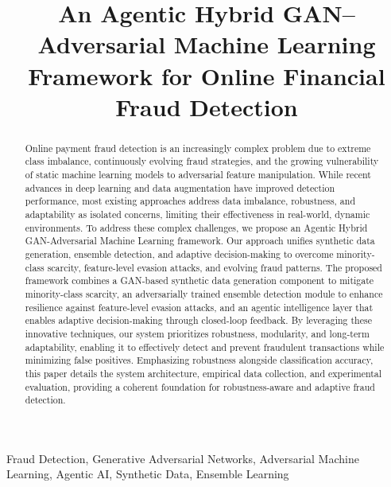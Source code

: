 \documentclass[conference]{IEEEtran}
\begin{document}
\title{An Agentic Hybrid GAN--Adversarial Machine Learning Framework for Online Financial Fraud Detection}

\author{
}

\maketitle

\begin{abstract}
Online payment fraud detection is an increasingly complex problem due to extreme class imbalance, continuously evolving fraud strategies, and the growing vulnerability of static machine learning models to adversarial feature manipulation. While recent advances in deep learning and data augmentation have improved detection performance, most existing approaches address data imbalance, robustness, and adaptability as isolated concerns, limiting their effectiveness in real-world, dynamic environments. To address these complex challenges, we propose an Agentic Hybrid GAN-Adversarial Machine Learning framework. Our approach unifies synthetic data generation, ensemble detection, and adaptive decision-making to overcome minority-class scarcity, feature-level evasion attacks, and evolving fraud patterns. The proposed framework combines a GAN-based synthetic data generation component to mitigate minority-class scarcity, an adversarially trained ensemble detection module to enhance resilience against feature-level evasion attacks, and an agentic intelligence layer that enables adaptive decision-making through closed-loop feedback. By leveraging these innovative techniques, our system prioritizes robustness, modularity, and long-term adaptability, enabling it to effectively detect and prevent fraudulent transactions while minimizing false positives. Emphasizing robustness alongside classification accuracy, this paper details the system architecture, empirical data collection, and experimental evaluation, providing a coherent foundation for robustness-aware and adaptive fraud detection.
\end{abstract}

\begin{IEEEkeywords}
Fraud Detection, Generative Adversarial Networks, Adversarial Machine Learning, Agentic AI, Synthetic Data, Ensemble Learning
\end{IEEEkeywords}
\end{document}
